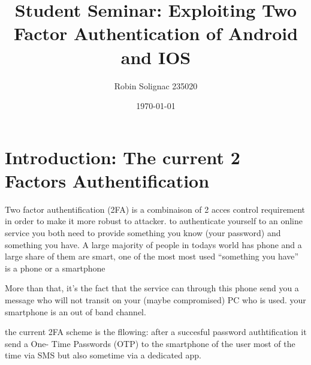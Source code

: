 \documentclass[11pt, a4paper,twocolumn]{article}
\title{Student Seminar: Exploiting Two Factor Authentication of Android and IOS}
\author{Robin Solignac 235020}
\date{\today}
\begin{document}
\maketitle
\begin{comment}
\begin{abstract}
Applications  which  can  be  used  in  different  platforms  now  use  two
factor authentication (2FA) to allow users to conveniently switch from one platform to another.
For example, when a user tries to login his gmail, it is not enough to enter correct password 
(first factor), it is also necessary to enter a PIN which is received by an SMS (second factor).
The aim of this project explaining the attacks against 2FA in IOS and Android devices and 
what can be the solutions. 
\end{abstract}
\end{comment}

\section{Introduction: The current 2 Factors Authentification}

Two factor authentification (2FA) is a combinaison of 2 acces control requirement in 
order to make it more robust to attacker. to authenticate yourself to an online 
service you both need to provide something you know (your password) and 
something you have. 
A large majority of people in todays world has phone and a large share of 
them are smart, one of the most most used ``something you have''  is a phone or 
a smartphone

More than that, it's the fact that the service can through this phone
send you a message  who will not transit on your (maybe compromised) PC 
who is used. your smartphone is an out of band channel.

\begin{comment} But it's not the only fact of having a phone or a phonenumber who is 
used in pratice to authenticate but the fact that services can send message to it and that that 
user can get it without using the main (maybe compromised) communication 
channel. This is called an . 
\end{comment} 

the current 2FA scheme is the fllowing: after a succesful password authtification it send a One-
Time Passwords (OTP) to the smartphone of the user most of the time via SMS 
but also sometime via a dedicated app.

\end{document}
